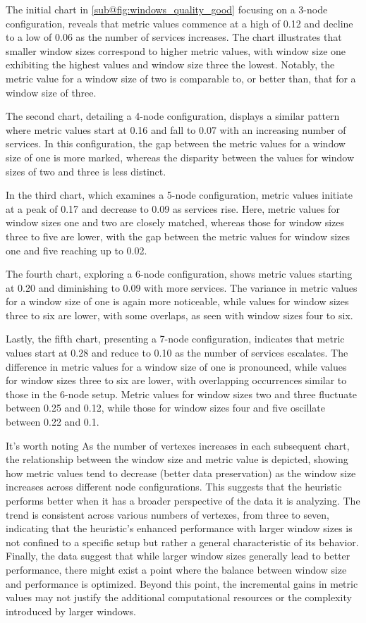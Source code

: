 The initial chart in \cref{sub@fig:windows_quality_good} focusing on a 3-node configuration, reveals that metric values commence at a high of 0.12 and decline to a low of 0.06 as the number of services increases. The chart illustrates that smaller window sizes correspond to higher metric values, with window size one exhibiting the highest values and window size three the lowest. Notably, the metric value for a window size of two is comparable to, or better than, that for a window size of three.

The second chart, detailing a 4-node configuration, displays a similar pattern where metric values start at 0.16 and fall to 0.07 with an increasing number of services. In this configuration, the gap between the metric values for a window size of one is more marked, whereas the disparity between the values for window sizes of two and three is less distinct.

In the third chart, which examines a 5-node configuration, metric values initiate at a peak of 0.17 and decrease to 0.09 as services rise. Here, metric values for window sizes one and two are closely matched, whereas those for window sizes three to five are lower, with the gap between the metric values for window sizes one and five reaching up to 0.02.

The fourth chart, exploring a 6-node configuration, shows metric values starting at 0.20 and diminishing to 0.09 with more services. The variance in metric values for a window size of one is again more noticeable, while values for window sizes three to six are lower, with some overlaps, as seen with window sizes four to six.

Lastly, the fifth chart, presenting a 7-node configuration, indicates that metric values start at 0.28 and reduce to 0.10 as the number of services escalates. The difference in metric values for a window size of one is pronounced, while values for window sizes three to six are lower, with overlapping occurrences similar to those in the 6-node setup. Metric values for window sizes two and three fluctuate between 0.25 and 0.12, while those for window sizes four and five oscillate between 0.22 and 0.1.

It's worth noting
As the number of vertexes increases in each subsequent chart, the relationship between the window size and metric value is depicted,
showing how metric values tend to decrease (better data preservation) as the window size increases across different node configurations.
This suggests that the heuristic performs better when it has a broader perspective of the data it is analyzing.
The trend is consistent across various numbers of vertexes, from three to seven, indicating that the heuristic's enhanced
performance with larger window sizes is not confined to a specific setup but rather a general characteristic of its behavior.
Finally, the data suggest that while larger window sizes generally lead to better performance,
there might exist a point where the balance between window size and performance is optimized.
Beyond this point, the incremental gains in metric values may not justify the additional computational resources or the complexity introduced by larger windows.


